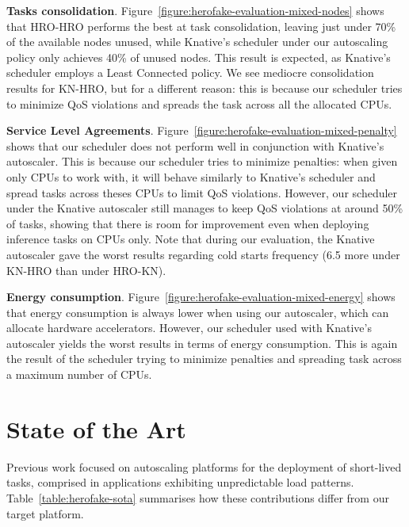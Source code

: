 \textbf{Tasks consolidation}. Figure~\ref{figure:herofake-evaluation-mixed-nodes} shows that HRO-HRO performs the best at task consolidation, leaving just under 70\% of the available nodes unused, while Knative's scheduler under our autoscaling policy only achieves 40\% of unused nodes. This result is expected, as Knative's scheduler employs a Least Connected policy. We see mediocre consolidation results for KN-HRO, but for a different reason: this is because our scheduler tries to minimize QoS violations and spreads the task across all the allocated CPUs.

\textbf{Service Level Agreements}. Figure~\ref{figure:herofake-evaluation-mixed-penalty} shows that our scheduler does not perform well in conjunction with Knative's autoscaler. This is because our scheduler tries to minimize penalties: when given only CPUs to work with, it will behave similarly to Knative's scheduler and spread tasks across theses CPUs to limit QoS violations. However, our scheduler under the Knative autoscaler still manages to keep QoS violations at around 50\% of tasks, showing that there is room for improvement even when deploying inference tasks on CPUs only. Note that during our evaluation, the Knative autoscaler gave the worst results regarding cold starts frequency (6.5 more under KN-HRO than under HRO-KN).

\textbf{Energy consumption}. Figure~\ref{figure:herofake-evaluation-mixed-energy} shows that energy consumption is always lower when using our autoscaler, which can allocate hardware accelerators. However, our scheduler used with Knative's autoscaler yields the worst results in terms of energy consumption. This is again the result of the scheduler trying to minimize penalties and spreading task across a maximum number of CPUs.

\section{State of the Art} \label{section:herofake-sota}

Previous work focused on autoscaling platforms for the deployment of short-lived tasks, comprised in applications exhibiting unpredictable load patterns. Table~\ref{table:herofake-sota} summarises how these contributions differ from our target platform.

